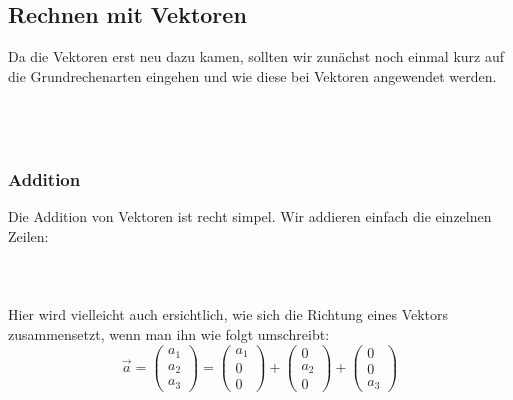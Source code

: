 \subsection{Rechnen mit Vektoren}
	Da die Vektoren erst neu dazu kamen, sollten wir zunächst noch einmal kurz auf
	die Grundrechenarten eingehen und wie diese bei Vektoren angewendet werden.
	\\ \\ \\ \\
	\subsubsection{Addition}
		Die Addition von Vektoren ist recht simpel. Wir addieren einfach die einzelnen
		Zeilen:
		\\ \\
		\formel{
			\[\vec{a}+\vec{b}=
			\begin{pmatrix}
			 a_1\\
			 a_2\\
			 a_3
			\end{pmatrix}+\begin{pmatrix}
			 b_1\\
			 b_2\\
			 b_3
			\end{pmatrix}
			=
			\begin{pmatrix}
			 a_1+b_1\\
			 a_2+b_2\\
			 a_3+b_3
			\end{pmatrix} \]
		}
		\\ \\
		Hier wird vielleicht auch ersichtlich, wie sich die Richtung eines Vektors
		zusammensetzt, wenn man ihn wie folgt umschreibt:
		\[\vec{a}=
		\begin{pmatrix}
		 a_1\\
		 a_2\\
		 a_3
		\end{pmatrix}=
		\begin{pmatrix}
		 a_1\\
		 0\\
		 0
		\end{pmatrix} +
		\begin{pmatrix}
		 0\\
		 a_2\\
		 0
		\end{pmatrix} +
		\begin{pmatrix}
		 0\\
		 0\\
		 a_3
		\end{pmatrix}
		\]

